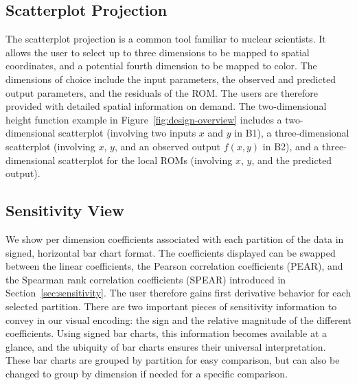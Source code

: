 \subsection{Scatterplot Projection}
\label{sec:scatterPlot}
The scatterplot projection is a common tool familiar to nuclear scientists.
%
It allows the user to select up to three dimensions to be mapped to spatial coordinates, and a potential fourth dimension to be mapped to color.
%
The dimensions of choice include the input parameters, the observed and predicted output parameters, and the residuals of the ROM.
%
The users are therefore provided with detailed spatial information on demand.
%
The two-dimensional height function example in Figure~\ref{fig:design-overview} includes a two-dimensional scatterplot (involving two inputs $x$ and $y$ in B1), a three-dimensional scatterplot (involving $x$, $y$, and an observed output $f(x,y)$ in B2), and a three-dimensional scatterplot for the local ROMs (involving $x$, $y$, and the predicted output).


\subsection{Sensitivity View}
\label{sec:sensitivityView}
We show per dimension coefficients associated with each partition of the data in signed, horizontal bar chart format.
%
The coefficients displayed can be swapped between the linear coefficients, the Pearson correlation coefficients (PEAR), and the Spearman rank correlation coefficients (SPEAR) introduced in Section~\ref{sec:sensitivity}.
%
The user therefore gains first derivative behavior for each selected partition.
%
There are two important pieces of sensitivity information to convey in our visual encoding: the sign and the relative magnitude of the different coefficients.
%
Using signed bar charts, this information becomes available at a glance, and the ubiquity of bar charts ensures their universal interpretation.
%
These bar charts are grouped by partition for easy comparison, but can also be changed to group by dimension if needed for a specific comparison.

